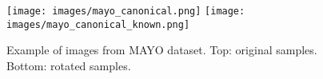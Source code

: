 \begin{figure}[!h]
    \centering
    \texttt{[image: images/mayo\_canonical.png]}\hfill
    \texttt{[image: images/mayo\_canonical\_known.png]}\hfill
    \caption{Example of images from MAYO dataset. Top: original samples. Bottom: rotated samples.}
    \label{fig:mayo_canonical}
\end{figure}